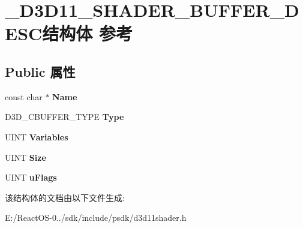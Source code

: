 \hypertarget{struct___d3_d11___s_h_a_d_e_r___b_u_f_f_e_r___d_e_s_c}{}\section{\+\_\+\+D3\+D11\+\_\+\+S\+H\+A\+D\+E\+R\+\_\+\+B\+U\+F\+F\+E\+R\+\_\+\+D\+E\+S\+C结构体 参考}
\label{struct___d3_d11___s_h_a_d_e_r___b_u_f_f_e_r___d_e_s_c}
\subsection*{Public 属性}
\begin{DoxyCompactItemize}
\item 
\mbox{\label{struct___d3_d11___s_h_a_d_e_r___b_u_f_f_e_r___d_e_s_c_a84a845588cacfdb1afcc01c8ed11fbea}} 
const char $\ast$ {\bfseries Name}
\item 
\mbox{\label{struct___d3_d11___s_h_a_d_e_r___b_u_f_f_e_r___d_e_s_c_a30cab3065488c3f5538649b86ce5930d}} 
D3\+D\+\_\+\+C\+B\+U\+F\+F\+E\+R\+\_\+\+T\+Y\+PE {\bfseries Type}
\item 
\mbox{\label{struct___d3_d11___s_h_a_d_e_r___b_u_f_f_e_r___d_e_s_c_a343adf179e5ce9c870ac446bee84440c}} 
U\+I\+NT {\bfseries Variables}
\item 
\mbox{\label{struct___d3_d11___s_h_a_d_e_r___b_u_f_f_e_r___d_e_s_c_ac28aaa3c49cbfb1574b38c4b5a092d28}} 
U\+I\+NT {\bfseries Size}
\item 
\mbox{\label{struct___d3_d11___s_h_a_d_e_r___b_u_f_f_e_r___d_e_s_c_a4c3da877981b87b9aa9ac36c2b66b5d1}} 
U\+I\+NT {\bfseries u\+Flags}
\end{DoxyCompactItemize}


该结构体的文档由以下文件生成\+:\begin{DoxyCompactItemize}
\item 
E\+:/\+React\+O\+S-\/0../sdk/include/psdk/d3d11shader.\+h\end{DoxyCompactItemize}
